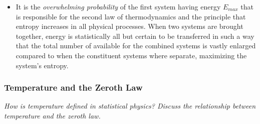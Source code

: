 \documentclass[11pt, a4paper]{article}
\begin{document}
\begin{itemize}
	\item It is the \textit{overwhelming probability} of the first system having energy $ E_{max} $ that is responsible for the second law of thermodynamics and the principle that entropy increases in all physical processes. When two systems are brought together, energy is statistically all but certain to be transferred in such a way that the total number of available for the combined systems is vastly enlarged compared to when the constituent systems where separate, maximizing the system's entropy.

\end{itemize}	

\subsubsection{Temperature and the Zeroth Law} \label{sss:temperature_stat_phys}
\textit{How is temperature defined in statistical physics? Discuss the relationship between temperature and the zeroth law.}
\end{document}
